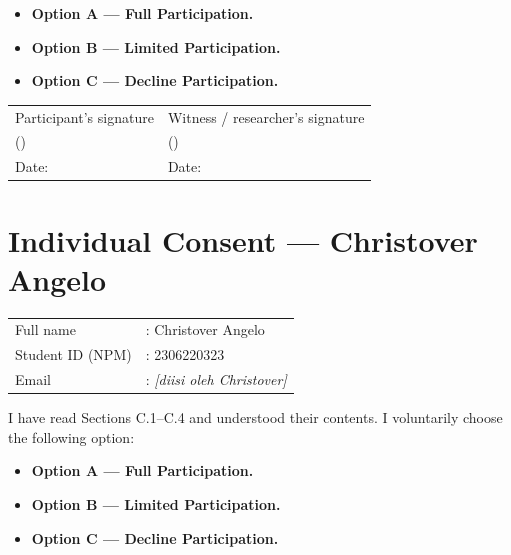 \documentclass[11pt,a4paper,oneside]{report}
\begin{document}
\vspace{0.5em}

\begin{itemize}[leftmargin=2em, label={$\square$}, itemsep=0.8em]
    \item \textbf{Option A --- Full Participation.}
    \item \textbf{Option B --- Limited Participation.}
    \item \textbf{Option C --- Decline Participation.}
\end{itemize}

\vfill

\noindent
\begin{tabular}{p{}p{}}
\centering Participant's signature & \centering Witness / researcher's signature \tabularnewline[2.5cm]
\centering (\hspace{4cm}) & \centering (\hspace{4cm}) \tabularnewline
\centering Date: \hspace{3cm} & \centering Date: \hspace{3cm} \tabularnewline
\end{tabular}

\newpage
\section*{Individual Consent --- Christover Angelo}

\noindent
\begin{tabular}{p{}p{}}
Full name        & : Christover Angelo \\
Student ID (NPM) & : 2306220323 \\
Email            & : \textit{[diisi oleh Christover]} \\
\end{tabular}

\vspace{1.5em}

I have read Sections C.1--C.4 and understood their contents. I voluntarily choose the following option:

\vspace{0.5em}

\begin{itemize}[leftmargin=2em, label={$\square$}, itemsep=0.8em]
    \item \textbf{Option A --- Full Participation.}
    \item \textbf{Option B --- Limited Participation.}
    \item \textbf{Option C --- Decline Participation.}
\end{itemize}
\end{document}
